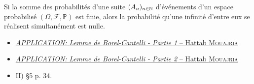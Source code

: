 \begin{lemme}
    Si la somme des probabilités d'une suite $(A_n)_{n \in \mathbb{N}}$ d'événements d'un espace probabilisé $(\Omega, \mathscr{F}, \mathbb{P})$ est finie, alors la probabilité qu'une infinité d'entre eux se réalisent simultanément est nulle.
\end{lemme}

\begin{itemize}
    \item \href{https://www.youtube.com/watch?v=Yw2qk42EZcM}{\textsl{APPLICATION: Lemme de Borel-Cantelli - Partie 1} -- Hattab \textsc{Mouajria}}
    \item \href{https://www.youtube.com/watch?v=2GqPQY-mBpk}{\textsl{APPLICATION: Lemme de Borel-Cantelli - Partie 2} -- Hattab \textsc{Mouajria}}
    \item \cite{intro_graph_alea} II) §5 p. 34.
\end{itemize}